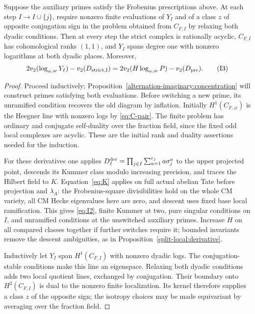 \begin{lemma}\label{alternation-imaginary:central-switch}
Suppose the auxiliary primes satisfy the Frobenius prescriptions above.
At each step \(I\to I\cup\{j\}\), require nonzero
finite evaluations of \(Y_I\) and of a class \(z\) of opposite conjugation
sign in the problem obtained from \(C_{F,I}\) by relaxing both dyadic
conditions. Then at every step the strict complex is rationally acyclic,
\(C_{F,I}\) has cohomological ranks \((1,1)\), and \(Y_I\) spans degree
one with nonzero logarithms at both dyadic places. Moreover,
\[
 2v_2(\log_{\omega,w}Y_I)-v_2(D_{\rm strict,I})
       =2v_2(H\log_{\omega,w}P)-v_2(D_{\rm pre}).
 \tag{I3}\label{eq:I3}
\]
\end{lemma}
\begin{proof}
Proceed inductively; Proposition~\ref{alternation-imaginary:concentration}
will construct primes satisfying both evaluations. Before switching a new
prime, its unramified condition recovers the old diagram by inflation.
Initially \(H^1(C_{F,\varnothing})\) is the Heegner line with nonzero
logs by \eqref{eq:C-pair}. The finite problem has ordinary and conjugate
self-duality over the fraction field, since the fixed odd local complexes
are acyclic. These are the initial rank and duality assertions needed for
the induction.

For these derivatives one applies
\(D_I^{\rm der}=\prod_{j\in I}\sum_{a=1}^{r_j}a\sigma_j^a\) to the
upper projected point, descends its Kummer class modulo increasing
precision, and traces the Hilbert field to \(K\). Equation~\eqref{eq:K}
applies on full actual abelian Tate before projection and \(\lambda_A\):
the Frobenius-square divisibilities hold on the whole CM variety, all
CM Hecke eigenvalues here are zero, and descent uses fixed base local
ramification. This gives \eqref{eq:I2}, finite Kummer at two, pure singular
conditions on \(I\), and unramified conditions at the unswitched auxiliary
primes. Increase \(H\) on all compared classes together if further
switches require it; bounded invariants remove the descent ambiguities,
as in Proposition~\ref{split-local:derivative}.

Inductively let \(Y_I\) span \(H^1(C_{F,I})\) with nonzero dyadic logs.
The conjugation-stable conditions make this line an eigenspace. Relaxing
both dyadic conditions adds two local quotient lines, exchanged by
conjugation. Their boundary onto \(H^2(C_{F,I})\) is dual to the nonzero
finite localization. Its kernel therefore supplies a class \(z\) of the
opposite sign; the isotropy choices may be made equivariant by averaging
over the fraction field.


\end{proof}
